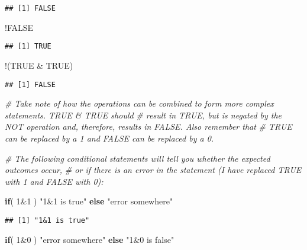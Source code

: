 \documentclass[
]{article}
\newenvironment{Shaded}{\begin{snugshade}}{\end{snugshade}}
\newcommand{\CommentTok}[1]{\textcolor[rgb]{0.56,0.35,0.01}{\textit{#1}}}
\newcommand{\ConstantTok}[1]{\textcolor[rgb]{0.00,0.00,0.00}{#1}}
\newcommand{\ControlFlowTok}[1]{\textcolor[rgb]{0.13,0.29,0.53}{\textbf{#1}}}
\newcommand{\DecValTok}[1]{\textcolor[rgb]{0.00,0.00,0.81}{#1}}
\newcommand{\NormalTok}[1]{#1}
\newcommand{\SpecialCharTok}[1]{\textcolor[rgb]{0.00,0.00,0.00}{#1}}
\newcommand{\StringTok}[1]{\textcolor[rgb]{0.31,0.60,0.02}{#1}}
\begin{document}
\begin{verbatim}
## [1] FALSE
\end{verbatim}

\begin{Shaded}
\begin{Highlighting}[]
\SpecialCharTok{!}\ConstantTok{FALSE}
\end{Highlighting}
\end{Shaded}

\begin{verbatim}
## [1] TRUE
\end{verbatim}

\begin{Shaded}
\begin{Highlighting}[]
\SpecialCharTok{!}\NormalTok{(}\ConstantTok{TRUE} \SpecialCharTok{\&} \ConstantTok{TRUE}\NormalTok{)}
\end{Highlighting}
\end{Shaded}

\begin{verbatim}
## [1] FALSE
\end{verbatim}

\begin{Shaded}
\begin{Highlighting}[]
\CommentTok{\# Take note of how the operations can be combined to form more complex statements. TRUE \& TRUE should}
\CommentTok{\# result in TRUE, but is negated by the NOT operation and, therefore, results in FALSE. Also remember that}
\CommentTok{\# TRUE can be replaced by a 1 and FALSE can be replaced by  a 0.}

\CommentTok{\# The following conditional statements will tell you whether the expected outcomes occur,}
\CommentTok{\# or if there is an error in the statement (I have replaced TRUE with 1 and FALSE with 0):}

\ControlFlowTok{if}\NormalTok{( }\DecValTok{1}\SpecialCharTok{\&}\DecValTok{1}\NormalTok{ ) }\StringTok{"1\&1 is true"} \ControlFlowTok{else} \StringTok{"error somewhere"}
\end{Highlighting}
\end{Shaded}

\begin{verbatim}
## [1] "1&1 is true"
\end{verbatim}

\begin{Shaded}
\begin{Highlighting}[]
\ControlFlowTok{if}\NormalTok{( }\DecValTok{1}\SpecialCharTok{\&}\DecValTok{0}\NormalTok{ ) }\StringTok{"error somewhere"} \ControlFlowTok{else} \StringTok{"1\&0 is false"}
\end{Highlighting}
\end{Shaded}
\end{document}
